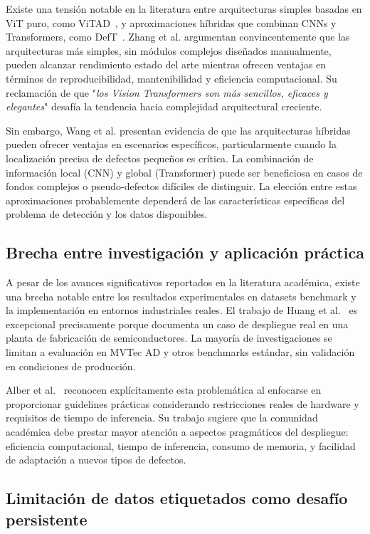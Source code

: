Existe una tensión notable en la literatura entre arquitecturas simples basadas en ViT puro, como ViTAD~\cite{zhang2025exploring}, y aproximaciones híbridas que combinan CNNs y Transformers, como DefT~\cite{wang2022defect}. Zhang et al. argumentan convincentemente que las arquitecturas más simples, sin módulos complejos diseñados manualmente, pueden alcanzar rendimiento estado del arte mientras ofrecen ventajas en términos de reproducibilidad, mantenibilidad y eficiencia computacional. Su reclamación de que "\textit{los Vision Transformers son más sencillos, eficaces y elegantes}" desafía la tendencia hacia complejidad arquitectural creciente.

Sin embargo, Wang et al. presentan evidencia de que las arquitecturas híbridas pueden ofrecer ventajas en escenarios específicos, particularmente cuando la localización precisa de defectos pequeños es crítica. La combinación de información local (CNN) y global (Transformer) puede ser beneficiosa en casos de fondos complejos o pseudo-defectos difíciles de distinguir. La elección entre estas aproximaciones probablemente dependerá de las características específicas del problema de detección y los datos disponibles.

\subsection{Brecha entre investigación y aplicación práctica}

A pesar de los avances significativos reportados en la literatura académica, existe una brecha notable entre los resultados experimentales en datasets benchmark y la implementación en entornos industriales reales. El trabajo de Huang et al.~\cite{huang2025semiconductor} es excepcional precisamente porque documenta un caso de despliegue real en una planta de fabricación de semiconductores. La mayoría de investigaciones se limitan a evaluación en MVTec AD y otros benchmarks estándar, sin validación en condiciones de producción.

Alber et al.~\cite{alber2024evaluating} reconocen explícitamente esta problemática al enfocarse en proporcionar guidelines prácticas considerando restricciones reales de hardware y requisitos de tiempo de inferencia. Su trabajo sugiere que la comunidad académica debe prestar mayor atención a aspectos pragmáticos del despliegue: eficiencia computacional, tiempo de inferencia, consumo de memoria, y facilidad de adaptación a nuevos tipos de defectos.

\subsection{Limitación de datos etiquetados como desafío persistente}

